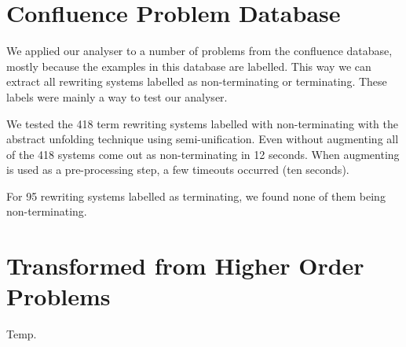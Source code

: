 \section{Confluence Problem Database}
We applied our analyser to a number of problems from the confluence database, mostly because the examples in this database are labelled. This way we can extract all rewriting systems labelled as non-terminating or terminating. These labels were mainly a way to test our analyser. 

We tested the 418 term rewriting systems labelled with non-terminating with the abstract unfolding technique using semi-unification. Even without augmenting all of the 418 systems come out as non-terminating in 12 seconds. When augmenting is used as a pre-processing step, a few timeouts occurred (ten seconds). 

For 95 rewriting systems labelled as terminating, we found none of them being non-terminating. 

\section{Transformed from Higher Order Problems}
Temp.
